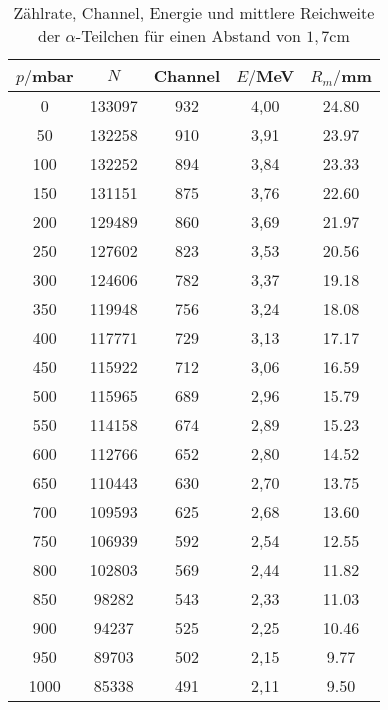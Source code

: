 \begin{table}[H]
  \centering
  \caption{Zählrate, Channel, Energie und mittlere Reichweite der $\alpha$-Teilchen für einen Abstand von $1,7$cm}
  \label{tab:Spannungsamplitude}
  \begin{tabular}{c c c c c}
    \toprule
    $p/$mbar & $N$ & Channel & $E/$MeV & $R_m/$mm \\
    \midrule
    0	  & 133097  & 932 &   4,00 & 24.80       \\
    50	& 132258  & 910 &   3,91 &  23.97      \\
    100 & 132252  & 894 &   3,84 & 23.33       \\
    150 & 131151  & 875 &   3,76 & 22.60       \\
    200 & 129489  & 860 &   3,69 & 21.97       \\
    250 & 127602  & 823 &   3,53 & 20.56       \\
    300 & 124606  & 782 &   3,37 & 19.18       \\
    350 & 119948  & 756 &   3,24 & 18.08       \\
    400 & 117771  & 729 &   3,13 & 17.17       \\
    450 & 115922  & 712 &   3,06 & 16.59       \\
    500 & 115965  & 689 &   2,96 & 15.79       \\
    550 & 114158  & 674 &   2,89 & 15.23       \\
    600 & 112766  & 652 &   2,80 & 14.52       \\
    650 & 110443  & 630 &   2,70 & 13.75       \\
    700 & 109593  & 625 &   2,68 & 13.60       \\
    750 & 106939  & 592 &   2,54 & 12.55      \\
    800 & 102803  & 569 &   2,44 & 11.82      \\
    850 & 98282	  & 543 &   2,33 & 11.03      \\
    900 & 94237	  & 525 &   2,25 & 10.46   \\
    950 & 89703	  & 502 &   2,15 & 9.77     \\
    1000& 85338   & 491 &   2,11 & 9.50    \\
    \bottomrule
  \end{tabular}
\end{table}





